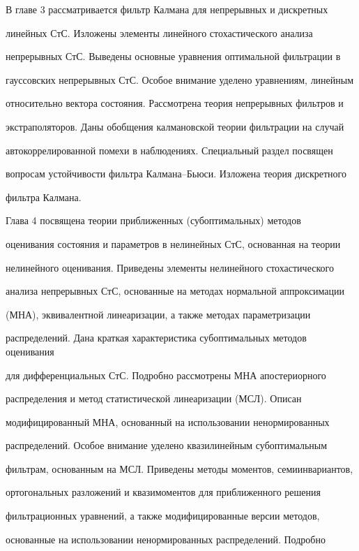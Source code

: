      


     В главе 3 рассматривается фильтр Калмана для непрерывных и дискретных 


линейных СтС. Изложены элементы линейного стохастического анализа 


непрерывных СтС. Выведены основные уравнения оптимальной фильтрации в 


гауссовских непрерывных СтС. Особое внимание уделено уравнениям, линейным 


относительно вектора состояния. Рассмотрена теория непрерывных фильтров и 


экстраполяторов. Даны обобщения калмановской теории фильтрации на случай 


автокоррелированной помехи в наблюдениях. Специальный раздел посвящен 


вопросам устойчивости фильтра Калмана--Бьюси. Изложена теория дискретного 


фильтра Калмана.


     


     Глава 4 посвящена теории приближенных (субоптимальных) методов 


оценивания состояния и параметров в нелинейных СтС, основанная на теории 


нелинейного оценивания. Приведены элементы нелинейного стохастического 


анализа непрерывных СтС, основанные на методах нормальной аппроксимации 


(МНА), эквивалентной линеаризации, а также методах параметризации 


распределений. Дана краткая характеристика субоптимальных методов оценивания 


для дифференциальных СтС. Подробно рассмотрены МНА апостериорного 


распределения и метод статистической линеаризации (МСЛ). Описан 


модифицированный МНА, основанный на использовании ненормированных 


распределений. Особое внимание уделено квазилинейным субоптимальным 


фильтрам, основанным на МСЛ. Приведены методы моментов, семиинвариантов, 


ортогональных разложений и квазимоментов для приближенного решения 


фильтрационных уравнений, а также модифицированные версии методов, 


основанные на использовании ненормированных распределений. Подробно 


